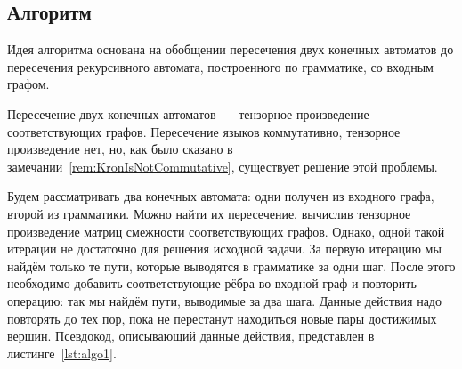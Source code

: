 \subsection{Алгоритм}

Идея алгоритма основана на обобщении пересечения двух конечных автоматов до пересечения рекурсивного автомата, построенного по грамматике, со входным графом.

Пересечение двух конечных автоматов~--- тензорное произведение соответствующих графов.
Пересечение языков коммутативно, тензорное произведение нет, но, как было сказано в замечании~\ref{rem:KronIsNotCommutative}, существует решение этой проблемы.

Будем рассматривать два конечных автомата: одни получен из входного графа, второй из грамматики.
Можно найти их пересечение, вычислив тензорное произведение матриц смежности соответствующих графов.
Однако, одной такой итерации не достаточно для решения исходной задачи. За первую итерацию мы найдём только те пути, которые выводятся в грамматике за одни шаг. После этого необходимо добавить соответствующие рёбра во входной граф и повторить операцию: так мы найдём пути, выводимые за два шага. Данные действия надо повторять до тех пор, пока не перестанут находиться новые пары достижимых вершин.
Псевдокод, описывающий данные действия, представлен в листинге~\ref{lst:algo1}.

\begin{algorithm}
\end{algorithm}


